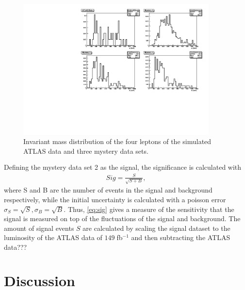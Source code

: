 \documentclass[twoside,        %
               BCOR12mm,       %
               ngerman,english, %
               fleqn,headsepline=false,footsepline=false
              ]{Vorlage/MFPREPORT}
\begin{document}
\begin{figure}[h!]
    \begin{center}
        \includegraphics[width=0.9\textwidth]{ZZ/mystery_mass_cut.pdf}
    \end{center}
    \caption{Invariant mass distribution of the four leptons of the simulated ATLAS data and three mystery data sets.}
    \label{fig:myst4}
\end{figure}

Defining the mystery data set 2 as the signal, the significance is calculated
with \cite{signifikanz}
\begin{align}
    \label{eq:sig}
    Sig=\frac{S}{\sqrt{S+B}},
\end{align}
where S and B are the number of events in the signal and background
respectively, while the initial uncertainty is calculated with a poisson error
$\sigma_S=\sqrt S, \sigma_B=\sqrt B$. Thus, \cref{eq:sig} gives a measure of
the sensitivity that the signal is measured on top of the fluctuations of the
signal and background. The amount of signal events $S$ are calculated by
scaling the signal dataset to the luminosity of the ATLAS data of
$149\;$fb$^{-1}$ and then subtracting the ATLAS data???


\section{Discussion}
\label{sec:discussion}



\newpage

\begin{appendices}
\end{appendices}
\end{document}
